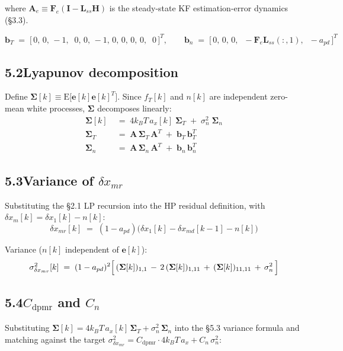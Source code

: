 \documentclass[11pt]{article}
\newcommand{\T}{^{T}}
\newcommand{\kB}{k_B}
\begin{document}
\noindent where $\bm{A}_e \equiv \bm{F}_e(\bm{I} - \bm{L}_{ss}\bm{H})$ is the steady-state KF estimation-error dynamics (\S3.3).

\[
\bm{b}_T \;=\; \bigl[\,0,\,0,\,{-}1,\;\;0,\,0,\,{-}1,\,0,\,0,\,0,\,0,\;\;0\,\bigr]\T,
\qquad
\bm{b}_n \;=\; \bigl[\,0,\,0,\,0,\;\;{-}\bm{F}_e\bm{L}_{ss}(:,1),\;\;{-}a_{pd}\,\bigr]\T
\]

\subsection*{5.2\quad Lyapunov decomposition}

Define $\bm{\Sigma}[k] \equiv \mathrm{E}\bigl[\bm{e}[k]\bm{e}[k]\T\bigr]$. Since $f_T[k]$ and $n[k]$ are independent zero-mean white processes, $\bm{\Sigma}$ decomposes linearly:
\begin{align}
\bm{\Sigma}[k] &\;=\; 4\kB T\,a_x[k]\;\bm{\Sigma}_T \;+\; \sigma^{2}_n\;\bm{\Sigma}_n \\[2pt]
\bm{\Sigma}_T  &\;=\; \bm{A}\,\bm{\Sigma}_T\,\bm{A}\T \;+\; \bm{b}_T\,\bm{b}_T\T \\[2pt]
\bm{\Sigma}_n  &\;=\; \bm{A}\,\bm{\Sigma}_n\,\bm{A}\T \;+\; \bm{b}_n\,\bm{b}_n\T
\end{align}

\subsection*{5.3\quad Variance of $\delta x_{mr}$}

Substituting the \S2.1 LP recursion into the HP residual definition, with $\delta x_m[k] = \delta x_1[k] - n[k]$:
\begin{equation}
\delta x_{mr}[k] \;=\; (1-a_{pd})\bigl(\delta x_1[k] - \delta x_{md}[k\!-\!1] - n[k]\bigr)
\end{equation}

Variance ($n[k]$ independent of $\bm{e}[k]$):
\begin{equation}
\sigma^{2}_{\delta x_{mr}}[k]
  \;=\; (1-a_{pd})^{2}\Bigl[\,
    (\bm{\Sigma}[k])_{1,1} \,-\, 2\,(\bm{\Sigma}[k])_{1,11} \,+\, (\bm{\Sigma}[k])_{11,11}
    \,+\, \sigma^{2}_n
  \,\Bigr]
\end{equation}

\subsection*{5.4\quad $C_{\mathrm{dpmr}}$ and $C_{n}$}

\noindent Substituting $\bm{\Sigma}[k] = 4\kB T\,a_x[k]\,\bm{\Sigma}_T + \sigma^{2}_n\,\bm{\Sigma}_n$ into the \S5.3 variance formula and matching against the target $\sigma^{2}_{\delta x_{mr}} = C_{\mathrm{dpmr}}\cdot 4\kB T\,a_x + C_{n}\,\sigma^{2}_n$:
\end{document}
